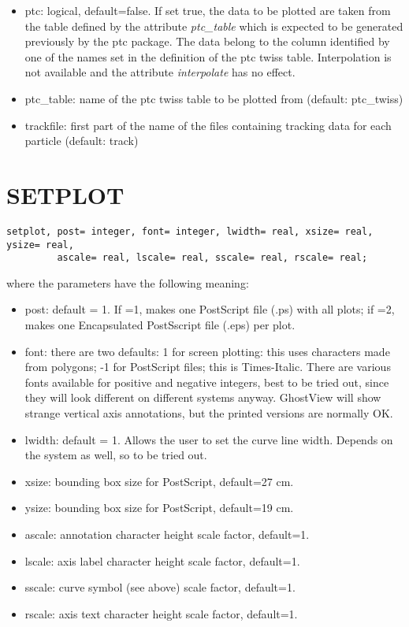 \begin{itemize}
   \item ptc: logical, default=false. If set true, the data to be
     plotted are taken from the table defined by the attribute
     \textit{ptc\_table} which is expected to be generated previously by
     the ptc package. The data belong to the column identified by one of
     the names set in the definition of the ptc twiss
     table. Interpolation is not available and the attribute
     \textit{interpolate} has no effect.   

   \item ptc\_table: name of the ptc twiss table to be plotted from
     (default: ptc\_twiss)  

   \item trackfile: first part of the name of the files containing
     tracking data for each particle (default: track)  
\end{itemize}


\section{SETPLOT}
\begin{verbatim}
setplot, post= integer, font= integer, lwidth= real, xsize= real, ysize= real,
         ascale= real, lscale= real, sscale= real, rscale= real;
\end{verbatim} 

where the parameters have the following meaning: 
\begin{itemize}
   \item post: default = 1. If =1, makes one PostScript file (.ps) with
     all plots; if =2, makes one Encapsulated PostSscript file (.eps)
     per plot.   
   \item font: there are two defaults: 1 for screen plotting: this uses
     characters made from polygons; -1 for PostScript files; this is
     Times-Italic. There are various fonts available for positive and
     negative integers, best to be tried out, since they will look
     different on different systems anyway. GhostView will show strange
     vertical axis annotations, but the printed versions are normally
     OK.   
   \item lwidth: default = 1. Allows the user to set the curve line
     width.  Depends on the system as well, so to be tried out.   
   \item xsize: bounding box size for PostScript, default=27 cm.   
   \item ysize: bounding box size for PostScript, default=19 cm.   
   \item ascale: annotation character height scale factor, default=1.   
   \item lscale: axis label character height scale factor, default=1.  
   \item sscale: curve symbol (see above) scale factor, default=1.  
   \item rscale: axis text character height scale factor, default=1.  
\end{itemize}


